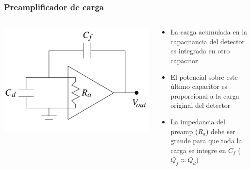 \documentclass{beamer}
\begin{document}
\begin{frame}
\frametitle{Preamplificador de carga}
\begin{columns}
\begin{column}{0.4\textwidth}
\includegraphics[width=\textwidth]{d2/preamp_q}
\end{column}
\begin{column}{0.6\textwidth}
\begin{itemize}
\item La carga acumulada en la capacitancia del detector es integrada en otro
capacitor
\item El potencial sobre este último capacitor es proporcional a la carga
original del detector 
\item \alert{La impedancia del preamp ($R_a$) debe ser grande para que toda la
carga se integre en $C_f$ ($Q_f \approx Q_d$)}
\end{itemize}
\end{column}
\end{columns}
\end{frame}
\end{document}
